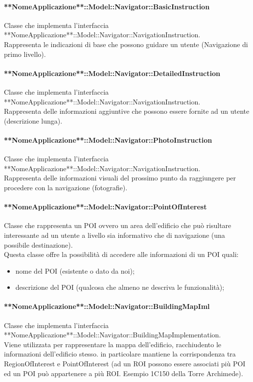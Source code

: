 \documentclass[../SpecificaTecnica.tex]{subfiles}
\begin{document}
				\paragraph{**NomeApplicazione**::Model::Navigator::BasicInstruction}
					Classe che implementa l'interfaccia\\ **NomeApplicazione**::Model::Navigator::NavigationInstruction. \\
					Rappresenta le indicazioni di base che possono guidare un utente (Navigazione di primo livello).
				\paragraph{**NomeApplicazione**::Model::Navigator::DetailedInstruction}
					Classe che implementa l'interfaccia\\ **NomeApplicazione**::Model::Navigator::NavigationInstruction. \\
					Rappresenta delle informazioni aggiuntive che possono essere fornite ad un utente (descrizione lunga).
				\paragraph{**NomeApplicazione**::Model::Navigator::PhotoInstruction}
					Classe che implementa l'interfaccia\\ **NomeApplicazione**::Model::Navigator::NavigationInstruction. \\
					Rappresenta delle informazioni visuali del prossimo punto da raggiungere per procedere con la navigazione (fotografie).
				\paragraph{**NomeApplicazione**::Model::Navigator::PointOfInterest}
					Classe che rappresenta un POI ovvero un area dell'edificio che può risultare interessante ad un utente a livello sia informativo che di navigazione (una possibile destinazione). \\
					Questa classe offre la possibilità di accedere alle informazioni di un POI quali:
					\begin{itemize}
						\item nome del POI (esistente o dato da noi);
						\item descrizione del POI (qualcosa che almeno ne descriva le funzionalità);
					\end{itemize}
				\paragraph{**NomeApplicazione**::Model::Navigator::BuildingMapIml}
					Classe che implementa l'interfaccia **NomeApplicazione**::Model::Navigator::BuildingMapImplementation. \\
					Viene utilizzata per rappresentare la mappa dell'edificio, racchiudento le informazioni dell'edificio stesso. in particolare mantiene la corrispondenza tra RegionOfInterest e PointOfInterest (ad un ROI possono essere associati più POI ed un POI può appartenere a più ROI. Esempio 1C150 della Torre Archimede). 
\end{document}
